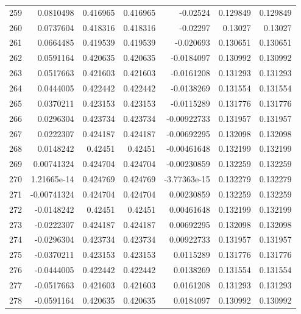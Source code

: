 \begin{tabular}{rrrrrrr}
 259 &  0.0810498   & 0.416965    & 0.416965    & -0.02524     & 0.129849    & 0.129849    \\
 260 &  0.0737604   & 0.418316    & 0.418316    & -0.02297     & 0.13027     & 0.13027     \\
 261 &  0.0664485   & 0.419539    & 0.419539    & -0.020693    & 0.130651    & 0.130651    \\
 262 &  0.0591164   & 0.420635    & 0.420635    & -0.0184097   & 0.130992    & 0.130992    \\
 263 &  0.0517663   & 0.421603    & 0.421603    & -0.0161208   & 0.131293    & 0.131293    \\
 264 &  0.0444005   & 0.422442    & 0.422442    & -0.0138269   & 0.131554    & 0.131554    \\
 265 &  0.0370211   & 0.423153    & 0.423153    & -0.0115289   & 0.131776    & 0.131776    \\
 266 &  0.0296304   & 0.423734    & 0.423734    & -0.00922733  & 0.131957    & 0.131957    \\
 267 &  0.0222307   & 0.424187    & 0.424187    & -0.00692295  & 0.132098    & 0.132098    \\
 268 &  0.0148242   & 0.42451     & 0.42451     & -0.00461648  & 0.132199    & 0.132199    \\
 269 &  0.00741324  & 0.424704    & 0.424704    & -0.00230859  & 0.132259    & 0.132259    \\
 270 &  1.21665e-14 & 0.424769    & 0.424769    & -3.77363e-15 & 0.132279    & 0.132279    \\
 271 & -0.00741324  & 0.424704    & 0.424704    &  0.00230859  & 0.132259    & 0.132259    \\
 272 & -0.0148242   & 0.42451     & 0.42451     &  0.00461648  & 0.132199    & 0.132199    \\
 273 & -0.0222307   & 0.424187    & 0.424187    &  0.00692295  & 0.132098    & 0.132098    \\
 274 & -0.0296304   & 0.423734    & 0.423734    &  0.00922733  & 0.131957    & 0.131957    \\
 275 & -0.0370211   & 0.423153    & 0.423153    &  0.0115289   & 0.131776    & 0.131776    \\
 276 & -0.0444005   & 0.422442    & 0.422442    &  0.0138269   & 0.131554    & 0.131554    \\
 277 & -0.0517663   & 0.421603    & 0.421603    &  0.0161208   & 0.131293    & 0.131293    \\
 278 & -0.0591164   & 0.420635    & 0.420635    &  0.0184097   & 0.130992    & 0.130992    \\

\end{tabular}
